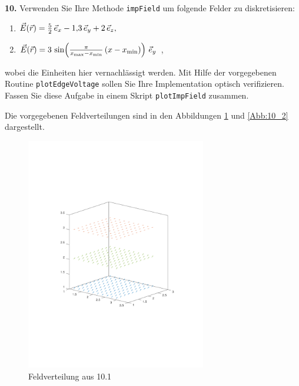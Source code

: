 \documentclass[Protokollheft.tex]{subfiles}
\begin{document}
\newpage
        \begin{framed}
	\noindent \textbf{10.} Verwenden Sie Ihre Methode \lstinline{impField} um folgende Felder zu diskretisieren:
        \begin{enumerate}
            \item $ \vec{E} (\vec r) = \frac{5}{2}\,  \vec{e}_x - 1,\!3\,  \vec{e}_y + 2\,  \vec{e}_z,$
            \item $ \vec{E} (\vec r) = 3\, \sin\! \left(\frac{\pi}{x_\text{max}-x_\text{min}}\, (x-x_\text{min}) \right)\,  \vec{e}_y$ ,
        \end{enumerate}
        wobei die Einheiten hier vernachlässigt werden. Mit Hilfe der vorgegebenen Routine \lstinline{plotEdgeVoltage} sollen Sie Ihre Implementation optisch verifizieren. Fassen Sie diese Aufgabe in einem Skript \lstinline{plotImpField} zusammen.\label{exer:plotImpField}
\end{framed}
	
	Die vorgegebenen Feldverteilungen sind in den Abbildungen \ref{Abb:10_1} und \ref{Abb:10_2} dargestellt.

	\begin{figure}[h]
		\centering
		\includegraphics[trim = 15mm 65mm 15mm 60mm, clip, width=0.7\textwidth]{10_1.pdf}
		\caption{Feldverteilung aus 10.1}
		\label{Abb:10_1}
	\end{figure}
	
\end{document}
